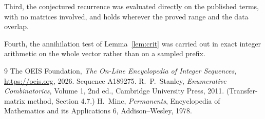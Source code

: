 \documentclass[11pt,a4paper]{article}
\theoremstyle{plain}
\theoremstyle{definition}
\begin{document}
Third, the conjectured recurrence was evaluated directly on the published terms, with no
matrices involved, and holds wherever the proved range and the data overlap.

Fourth, the annihilation test of Lemma~\ref{lem:crit} was carried out in exact integer
arithmetic on the whole vector rather than on a sampled prefix.

\begin{thebibliography}{9}
 The OEIS Foundation, \emph{The On-Line Encyclopedia of Integer
Sequences}, \url{https://oeis.org}, 2026. Sequence A189275.
 R.~P.~Stanley, \emph{Enumerative Combinatorics}, Volume 1, 2nd ed.,
Cambridge University Press, 2011. (Transfer-matrix method, Section 4.7.)
 H.~Minc, \emph{Permanents}, Encyclopedia of Mathematics and its
Applications 6, Addison--Wesley, 1978.
\end{thebibliography}
\end{document}

